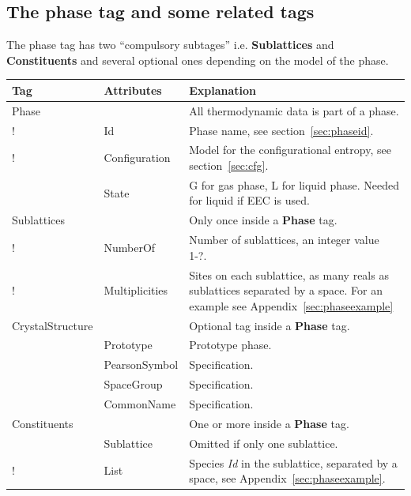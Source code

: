 \documentclass{article}
\begin{document}
\newpage 

\subsection{The phase tag and some related tags}\label{sec:phase}\label{sec:dispart}

The phase tag has two ``compulsory subtages'' i.e. {\bf Sublattices}
and {\bf Constituents} and several optional ones depending on the
model of the phase.

\begin{tabular}{|p{} p{} p{}|}\hline
  Tag & Attributes & Explanation\\\hline

  Phase & & All thermodynamic data is part of a phase.\\
!       & Id & Phase name, see section~\ref{sec:phaseid}. \\
!       & Configuration &  Model for the configurational entropy, see section~\ref{sec:cfg}.\\
       & State & G for gas phase, L for liquid phase.  Needed for liquid
                 if EEC is used.\\\hline

  Sublattices & & Only once inside a {\bf Phase} tag.\\
!        & NumberOf &  Number of sublattices, an integer value 1-?. \\
!        & Multiplicities & Sites on each sublattice, as many reals as sublattices separated by a space.  For an example see Appendix~\ref{sec:phaseexample}\\\hline

  CrystalStructure & & Optional tag inside a {\bf Phase} tag.\\
        & Prototype & Prototype phase.\\
        & PearsonSymbol & Specification.\\
        & SpaceGroup & Specification.\\
        & CommonName & Specification.\\\hline

  Constituents & & One or more inside a {\bf Phase} tag.\\
               & Sublattice & Omitted if only one sublattice.\\
!              & List &  Species {\em Id} in the sublattice,
               separated by a space, see Appendix~\ref{sec:phaseexample}.\\\hline


\end{tabular}
\end{document}
